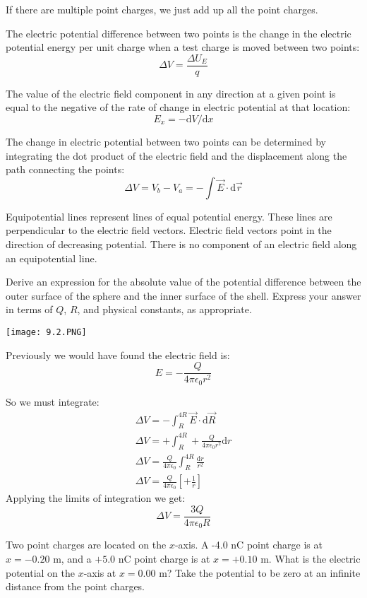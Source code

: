 \documentclass[../em.tex]{subfiles}
\begin{document}
If there are multiple point charges, we just add up all the point charges.

The electric potential difference between two points is the change in the electric potential energy
per unit charge when a test charge is moved between two points:
\[\Delta{V}=\frac{\Delta{U_E}}{q}\]

The value of the electric field component in any direction at a given point is equal to the 
negative of the rate of change in electric potential at that location:
\[E_x=-\mathrm{d}V/\mathrm{d}x\]

The change in electric potential between two points can be determined by integrating the dot product
of the electric field and the displacement along the path connecting the points:
\[\Delta{V}=V_b-V_a=-\int{\vec{E}\cdot\mathrm{d}\vec{r}}\]

Equipotential lines represent lines of equal potential energy. These lines are perpendicular to the electric field vectors.
Electric field vectors point in the direction of decreasing potential. There is no component of an electric field along an equipotential line.

\begin{example}
    Derive an expression for the absolute value of the potential difference between the outer surface
    of the sphere and the inner surface of the shell. Express your answer in terms of $Q$, $R$, and physical constants,
    as appropriate.

    \begin{center}
        \texttt{[image: 9.2.PNG]}
    \end{center}

    Previously we would have found the electric field is:
    \[E=-\frac{Q}{4\pi\epsilon_0r^2}\]

    So we must integrate:
    \begin{align*}
    \Delta V=-\int_R^{4R}\vec{E}\cdot\mathrm{d}\vec{R} \\
    \Delta V = +\int_R^{4R}+\frac{Q}{4\pi\epsilon_0 r^2}\mathrm{d}r\\
    \Delta V = \frac{Q}{4\pi\epsilon_0}\int_R^{4R}\frac{\mathrm{d}r}{r^2}\\
    \Delta V = \frac{Q}{4\pi\epsilon_0}\left[+\frac{1}{r}\right]
    \end{align*}
    Applying the limits of integration we get: 
    \[\Delta V = \frac{3Q}{4\pi\epsilon_0 R}\]
\end{example}

\ex Two point charges are located on the $x$-axis. A -4.0 nC point charge is at $x=-0.20$ m, and a $+5.0$ nC point charge is at $x=+0.10$ m. What is the electric potential on the $x$-axis at $x=0.00$ m? Take the potential to be zero at an infinite distance from the point charges.
\end{document}
